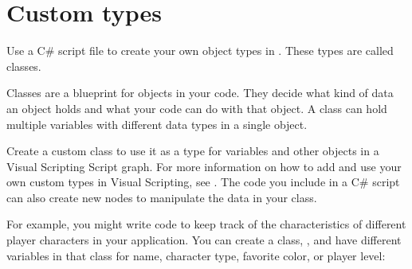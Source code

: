\chapter{Custom types}
\hypertarget{md__hey_tea_9_2_library_2_package_cache_2com_8unity_8visualscripting_0d1_88_80_2_documentation_0i_2vs-custom-types}{}\label{md__hey_tea_9_2_library_2_package_cache_2com_8unity_8visualscripting_0d1_88_80_2_documentation_0i_2vs-custom-types}
\label{md__hey_tea_9_2_library_2_package_cache_2com_8unity_8visualscripting_0d1_88_80_2_documentation_0i_2vs-custom-types_autotoc_md5310}%
%
 Use a C\# script file to create your own object types in . These types are called classes.

Classes are a blueprint for objects in your code. They decide what kind of data an object holds and what your code can do with that object. A class can hold multiple variables with different data types in a single object.

Create a custom class to use it as a type for variables and other objects in a Visual Scripting Script graph. For more information on how to add and use your own custom types in Visual Scripting, see . The code you include in a C\# script can also create new nodes to manipulate the data in your class.

For example, you might write code to keep track of the characteristics of different player characters in your application. You can create a class, {\ttfamily {}}, and have different variables in that class for name, character type, favorite color, or player level\+:


